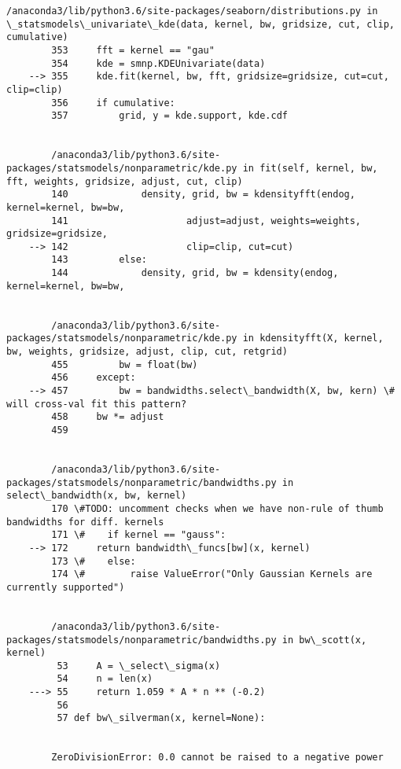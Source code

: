 \documentclass[11pt]{article}
\begin{document}
\begin{Verbatim}[commandchars=\\\{\}]
        /anaconda3/lib/python3.6/site-packages/seaborn/distributions.py in \_statsmodels\_univariate\_kde(data, kernel, bw, gridsize, cut, clip, cumulative)
        353     fft = kernel == "gau"
        354     kde = smnp.KDEUnivariate(data)
    --> 355     kde.fit(kernel, bw, fft, gridsize=gridsize, cut=cut, clip=clip)
        356     if cumulative:
        357         grid, y = kde.support, kde.cdf


        /anaconda3/lib/python3.6/site-packages/statsmodels/nonparametric/kde.py in fit(self, kernel, bw, fft, weights, gridsize, adjust, cut, clip)
        140             density, grid, bw = kdensityfft(endog, kernel=kernel, bw=bw,
        141                     adjust=adjust, weights=weights, gridsize=gridsize,
    --> 142                     clip=clip, cut=cut)
        143         else:
        144             density, grid, bw = kdensity(endog, kernel=kernel, bw=bw,


        /anaconda3/lib/python3.6/site-packages/statsmodels/nonparametric/kde.py in kdensityfft(X, kernel, bw, weights, gridsize, adjust, clip, cut, retgrid)
        455         bw = float(bw)
        456     except:
    --> 457         bw = bandwidths.select\_bandwidth(X, bw, kern) \# will cross-val fit this pattern?
        458     bw *= adjust
        459 


        /anaconda3/lib/python3.6/site-packages/statsmodels/nonparametric/bandwidths.py in select\_bandwidth(x, bw, kernel)
        170 \#TODO: uncomment checks when we have non-rule of thumb bandwidths for diff. kernels
        171 \#    if kernel == "gauss":
    --> 172     return bandwidth\_funcs[bw](x, kernel)
        173 \#    else:
        174 \#        raise ValueError("Only Gaussian Kernels are currently supported")


        /anaconda3/lib/python3.6/site-packages/statsmodels/nonparametric/bandwidths.py in bw\_scott(x, kernel)
         53     A = \_select\_sigma(x)
         54     n = len(x)
    ---> 55     return 1.059 * A * n ** (-0.2)
         56 
         57 def bw\_silverman(x, kernel=None):


        ZeroDivisionError: 0.0 cannot be raised to a negative power

    \end{Verbatim}

    \begin{center}
    \end{center}
    { \hspace*{\fill} \\}
    
\end{document}
